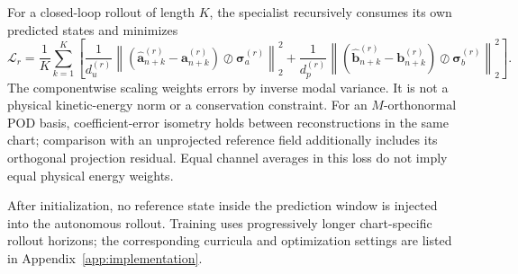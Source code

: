 For a closed-loop rollout of length $K$, the specialist recursively
consumes its own predicted states and minimizes
\begin{equation}
  \mathcal L_r
  =
  \frac{1}{K}
  \sum_{k=1}^{K}
  \left[
    \frac{1}{d_u^{(r)}}
    \left\|
      \left(
        \widehat{\bm a}_{n+k}^{(r)}
        -
        \bm a_{n+k}^{(r)}
      \right)
      \oslash
      \bm\sigma_a^{(r)}
    \right\|_2^2
    +
    \frac{1}{d_p^{(r)}}
    \left\|
      \left(
        \widehat{\bm b}_{n+k}^{(r)}
        -
        \bm b_{n+k}^{(r)}
      \right)
      \oslash
      \bm\sigma_b^{(r)}
    \right\|_2^2
  \right].
  \label{eq:app_true_rollout_loss}
\end{equation}
The componentwise scaling weights errors by inverse modal variance. It is not a physical kinetic-energy norm or a conservation constraint. For an $M$-orthonormal POD basis, coefficient-error isometry holds between reconstructions in the same chart; comparison with an unprojected reference field additionally includes its orthogonal projection residual. Equal channel averages in this loss do not imply equal physical energy weights.

After initialization, no reference state inside the prediction window is
injected into the autonomous rollout. Training uses progressively longer
chart-specific rollout horizons; the corresponding curricula and
optimization settings are listed in Appendix~\ref{app:implementation}.
